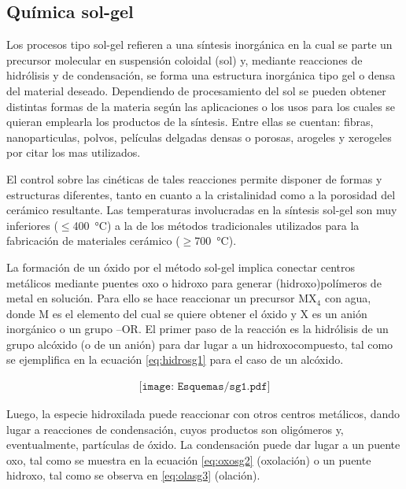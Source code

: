 	\subsection{Química sol-gel}

	 Los procesos tipo sol-gel refieren a una síntesis inorgánica en la cual se parte un precursor molecular en suspensión coloidal (sol) y, mediante reacciones de hidrólisis y de condensación, se  forma una estructura inorgánica tipo gel o densa del material deseado. Dependiendo de procesamiento del sol se pueden obtener distintas formas de la materia según las aplicaciones o los usos para los cuales se quieran emplearla los productos de la síntesis. Entre ellas se cuentan: fibras, nanoparticulas, polvos, películas delgadas densas o porosas, arogeles y xerogeles por citar los mas utilizados.

	 El control sobre las cinéticas de tales reacciones permite disponer de formas y estructuras diferentes, tanto en cuanto a la cristalinidad como a la porosidad del cerámico resultante. Las temperaturas involucradas en la síntesis sol-gel son muy inferiores ($\leq$\SI{400}{\celsius}) a la de los métodos tradicionales utilizados para la fabricación de materiales cerámico ($\geq$\SI{700}{\celsius}).\cite{Brinker1990,Jolivet2000,Wright2001}

	 La formación de un óxido por el método sol-gel implica conectar centros metálicos mediante puentes oxo o hidroxo para generar (hidroxo)polímeros de metal en solución. Para ello se hace reaccionar un precursor MX$_4$ con agua, donde M es el elemento del cual se quiere obtener el óxido y X es un anión inorgánico o un grupo –OR. El primer paso de la reacción es la hidrólisis de un grupo alcóxido (o de un anión) para dar lugar a un hidroxocompuesto, tal como se ejemplifica en la ecuación \ref{eq:hidrosg1} para el caso de un alcóxido.
			
			 \begin{equation}
 				\begin{aligned}
 				\texttt{[image: Esquemas/sg1.pdf]}
 				\end{aligned}
 				\label{eq:hidrosg1}
 	 			\end{equation}

    	Luego, la especie hidroxilada puede reaccionar con otros centros metálicos, dando lugar a reacciones de condensación, cuyos productos son oligómeros y, eventualmente, partículas de óxido. La condensación puede dar lugar a un puente oxo, tal como se muestra en la ecuación \ref{eq:oxosg2} (oxolación) o un puente hidroxo, tal como se observa en \ref{eq:olasg3} (olación). 

